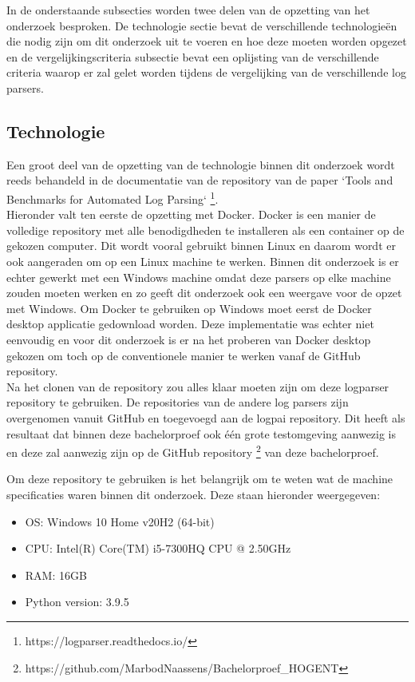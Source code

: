 In de onderstaande subsecties worden twee delen van de opzetting van het onderzoek besproken. De technologie sectie bevat de verschillende technologieën die nodig zijn om dit onderzoek uit te voeren en hoe deze moeten worden opgezet en de vergelijkingscriteria subsectie bevat een oplijsting van de verschillende criteria waarop er zal gelet worden tijdens de vergelijking van de verschillende log parsers.

\subsection{Technologie}
\label{section:Technologie}
Een groot deel van de opzetting van de technologie binnen dit onderzoek wordt reeds behandeld in de documentatie van de repository van de paper `Tools and Benchmarks for Automated Log Parsing` \autocite{TBA2019} \footnote{https://logparser.readthedocs.io/}.\\

Hieronder valt ten eerste de opzetting met Docker. Docker is een manier de volledige repository met alle benodigdheden te installeren als een container op de gekozen computer. Dit wordt vooral gebruikt binnen Linux en daarom wordt er ook aangeraden om op een Linux machine te werken. Binnen dit onderzoek is er echter gewerkt met een Windows machine omdat deze parsers op elke machine zouden moeten werken en zo geeft dit onderzoek ook een weergave voor de opzet met Windows. Om Docker te gebruiken op Windows moet eerst de Docker desktop applicatie gedownload worden. Deze implementatie was echter niet eenvoudig en voor dit onderzoek is er na het proberen van Docker desktop gekozen om toch op de conventionele manier te werken vanaf de GitHub repository.\\

Na het clonen van de repository zou alles klaar moeten zijn om deze logparser repository te gebruiken. De repositories van de andere log parsers zijn overgenomen vanuit GitHub en toegevoegd aan de logpai repository. Dit heeft als resultaat dat binnen deze bachelorproef ook één grote testomgeving aanwezig is en deze zal aanwezig zijn op de GitHub repository \footnote{https://github.com/MarbodNaassens/Bachelorproef\_HOGENT} van deze bachelorproef.

Om deze repository te gebruiken is het belangrijk om te weten wat de machine specificaties waren binnen dit onderzoek. Deze staan hieronder weergegeven:
\begin{itemize}
    \item OS: Windows 10 Home v20H2 (64-bit)
    \item CPU: Intel(R) Core(TM) i5-7300HQ CPU @ 2.50GHz
    \item RAM: 16GB
    \item Python version: 3.9.5
\end{itemize}

